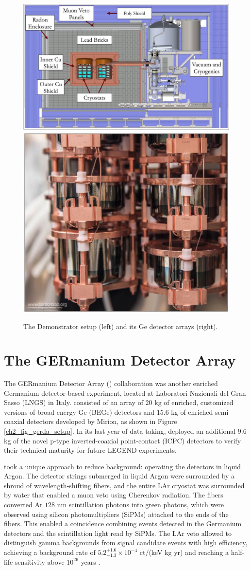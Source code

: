 \begin{figure}
  \centering
  \includegraphics[height=0.34\columnwidth]{ch2/figs/mjd_setup.pdf}
  \qquad
  \includegraphics[height=0.34\columnwidth]{ch2/figs/mjd_ppc_array.pdf}
  \caption{The {\MJ} Demonstrator setup (left) and its Ge detector arrays (right).}
    \label{fig:mjd}
  \end{figure}
 
\section{The GERmanium Detector Array}

The GERmanium Detector Array ({\Gerda}) collaboration was another enriched Germanium detector-based experiment, located at Laboratori Nazionali del Gran Sasso (LNGS) in Italy. {\Gerda} consisted of an array of $20$ kg of enriched, customized versions of broad-energy Ge (BEGe) detectors and $15.6$ kg of enriched semi-coaxial detectors developed by Mirion, as shown in Figure \ref{ch2_fig_gerda_setup}. In its last year of data taking, {\Gerda} deployed an additional $9.6$ kg of the novel p-type inverted-coaxial point-contact (ICPC) detectors to verify their technical maturity for future LEGEND experiments.

{\Gerda} took a unique approach to reduce background: operating the detectors in liquid Argon. The detector strings submerged in liquid Argon were surrounded by a shroud of wavelength-shifting fibers, and the entire LAr cryostat was surrounded by water that enabled a muon veto using Cherenkov radiation. The fibers converted Ar $128$ nm scintillation photons into green photons, which were observed using silicon photomultipliers (SiPMs) attached to the ends of the fibers. This enabled a coincidence combining events detected in the Germanium detectors and the scintillation light read by SiPMs. The LAr veto allowed {\Gerda} to distinguish gamma backgrounds from {\onbb} signal candidate events with high efficiency, achieving a background rate of $5.2^{+1.6}_{-1.3}\times 10^{-4}$ ct/(keV kg yr) and reaching a half-life sensitivity above $10^{26}$ years \cite{GERDA_final}.


